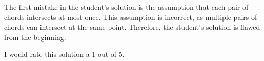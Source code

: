 The first mistake in the student's solution is the assumption that each pair of chords intersects at most once. This assumption is incorrect, as multiple pairs of chords can intersect at the same point. Therefore, the student's solution is flawed from the beginning.

I would rate this solution a 1 out of 5.
